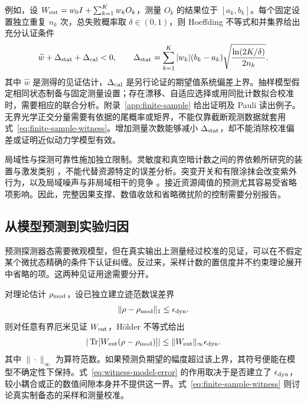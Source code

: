 \documentclass[UTF8,11pt,a4paper,fontset=none]{ctexart}
\newcommand{\Tr}{\operatorname{Tr}}
\begin{document}
例如，设 $W_{\rm ent}=w_0I+\sum_{k=1}^K w_kO_k$，测量 $O_k$ 的结果位于 $[a_k,b_k]$。每个固定设置独立重复 $n_k$ 次，总失败概率取 $\delta\in(0,1)$，则 Hoeffding 不等式和并集界给出充分认证条件 \cite{Hoeffding1963}
\begin{equation}
\widehat w+\Delta_{\rm stat}+\Delta_{\rm cal}<0,\qquad
\Delta_{\rm stat}=\sum_{k=1}^K|w_k|(b_k-a_k)
\sqrt{\frac{\ln(2K/\delta)}{2n_k}}.
\label{eq:finite-sample-witness}
\end{equation}
其中 $\widehat w$ 是测得的见证估计，$\Delta_{\rm cal}$ 是另行论证的期望值系统偏差上界。抽样模型假定相同状态制备与固定测量设置；存在漂移、自适应选择或用同批计数拟合校准时，需要相应的联合分析。附录~\ref{app:finite-sample} 给出证明及 Pauli 读出例子。无界光学正交分量需要有依据的尾概率或矩界，不能仅靠截断观测数据就套用式~\eqref{eq:finite-sample-witness}。增加测量次数能够减小 $\Delta_{\rm stat}$，却不能消除校准偏差或证明近似动力学模型有效。

局域性与探测可靠性施加独立限制。灵敏度和真空暗计数之间的界依赖所研究的装置与激发类别 \cite{Falcone2026}，不能代替资源特定的误差分析。突变开关和有限涂抹会改变紫外行为，以及局域噪声与非局域相干的竞争 \cite{Schlicht2004,LoukoSatz2006,LoukoSatz2008,PozasKerstjens2015}。接近资源阈值的预测尤其容易受省略项影响。因此，完整因果支撑、数值收敛和省略微扰阶的控制需要分别报告。

\subsection{从模型预测到实验归因}
预测探测器态需要微观模型，但在真实输出上测量经过校准的见证，可以在不假定某个微扰态精确的条件下认证纠缠。反过来，采样计数的置信度并不约束理论展开中省略的项。这两种见证用途需要分开。

对理论估计 $\rho_{\rm mod}$，设已独立建立迹范数误差界
\begin{equation}
\|\rho-\rho_{\rm mod}\|_1\leq\epsilon_{\rm dyn}.
\label{eq:dynamical-error-budget}
\end{equation}
则对任意有界厄米见证 $W_{\rm ent}$，H\"older 不等式给出
\begin{equation}
|\Tr[W_{\rm ent}(\rho-\rho_{\rm mod})]|
\leq\|W_{\rm ent}\|_\infty\epsilon_{\rm dyn}.
\label{eq:witness-model-error}
\end{equation}
其中 $\|\cdot\|_\infty$ 为算符范数。如果预测负期望的幅度超过该上界，其符号便能在模型不确定性下保持。式~\eqref{eq:witness-model-error} 的作用取决于是否建立了 $\epsilon_{\rm dyn}$，较小耦合或正的数值间隙本身并不提供这一界。式~\eqref{eq:finite-sample-witness} 则讨论真实制备态的采样和测量校准。
\end{document}
